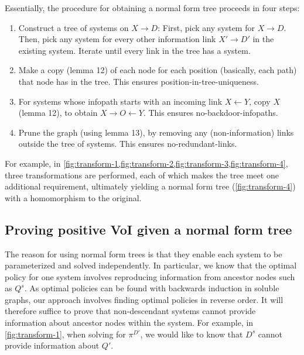 Essentially, the procedure for obtaining a normal form tree proceeds in four steps:
\begin{enumerate}
    \item Construct a tree of systems on $X \to D$: First, pick any system for $X\to D$. Then, pick any system for every other information link $X' \to D'$ in the existing system. Iterate until every link in the tree has a system. 
    
    \item 
    Make a copy (lemma 12) of each node for each position (basically, each path) that node has in the tree. 
    This ensures position-in-tree-uniqueness.
    
    \item For systems whose infopath starts with an incoming link $X \gets Y$, copy $X$ (lemma 12), to obtain $X\to  O \gets Y$. 
    This ensures no-backdoor-infopaths.
    
    \item Prune the graph (using lemma 13), by removing any (non-information) links outside the tree of systems. 
    This ensures no-redundant-links.
\end{enumerate}
For example, in \cref{fig:transform-1,fig:transform-2,fig:transform-3,fig:transform-4},
three transformations are performed, each of which makes the tree meet one additional 
requirement, ultimately yielding a normal form tree (\cref{fig:transform-4}) with a homomorphism to the original.~


\subsection{Proving positive VoI given a normal form tree} \label{sec:voi-given-nft-main}


The reason for using normal form trees is that they enable each system to be parameterized and solved independently.
In particular, we know that the optimal policy for one system involves reproducing information from ancestor nodes such as $Q^s$.
As optimal policies can be found with backwards induction in soluble graphs, our approach involves finding optimal policies in reverse order.
It will therefore suffice to prove that 
non-descendant systems cannot provide information about ancestor nodes within the system.
For example, 
in \cref{fig:transform-1}, when solving for $\pi^{D'}$, 
we would like to know that $D^s$ cannot provide information about $Q'$.~



